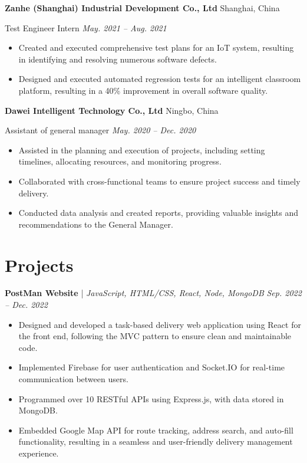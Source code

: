 \documentclass[hidelinks, 11pt,letterpaper]{article}
\newcommand{\resumeItemListStart}{
    \begin{itemize}[itemsep=1pt, parsep=0pt, topsep=0pt]
}
\newcommand{\resumeItemListEnd}{
    \end{itemize}
}
\begin{document}
\textbf{Zanhe (Shanghai) Industrial Development Co., Ltd} \hfill Shanghai, China

Test Engineer Intern \hfill \textit{May. 2021 -- Aug. 2021}

\resumeItemListStart
	\item Created and executed comprehensive test plans for an IoT system, resulting in identifying and resolving numerous software defects.
        \item Designed and executed automated regression tests for an intelligent classroom platform, resulting in a 40\% improvement in overall software quality.
\resumeItemListEnd

\textbf{Dawei Intelligent Technology Co., Ltd} \hfill Ningbo, China

Assistant of general manager \hfill \textit{May. 2020 -- Dec. 2020}

\resumeItemListStart
	\item Assisted in the planning and execution of projects, including setting timelines, allocating resources, and monitoring progress.
        \item Collaborated with cross-functional teams to ensure project success and timely delivery.
        \item Conducted data analysis and created reports, providing valuable insights and recommendations to the General Manager.
\resumeItemListEnd

\section{Projects}

\textbf{PostMan Website} | \emph{JavaScript, HTML/CSS, React, Node, MongoDB} \hfill \textit{Sep. 2022 -- Dec. 2022}

\resumeItemListStart
    \item Designed and developed a task-based delivery web application using React for the front end, following the MVC pattern to ensure clean and maintainable code. 
    \item Implemented Firebase for user authentication and Socket.IO for real-time communication between users. \item Programmed over 10 RESTful APIs using Express.js, with data stored in MongoDB. 
    \item Embedded Google Map API for route tracking, address search, and auto-fill functionality, resulting in a seamless and user-friendly delivery management experience.
\resumeItemListEnd
\end{document}

